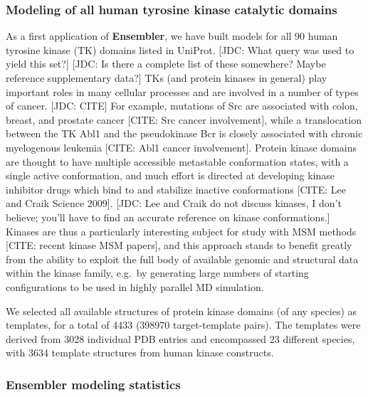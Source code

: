 \documentclass[aps,pre,twocolumn,nofootinbib,superscriptaddress,linenumbers]{revtex4-1}
\begin{document}
\subsubsection*{Modeling of all human tyrosine kinase catalytic domains}

As a first application of {\bf Ensembler}, we have built models for all 90 human tyrosine kinase (TK) domains listed in UniProt.
{\color{red}[JDC: What query was used to yield this set?]}
{\color{red}[JDC: Is there a complete list of these somewhere?  Maybe reference supplementary data?]}
TKs (and protein kinases in general) play important roles in many cellular processes and are involved in a number of types of cancer.
{\color{red}[JDC: CITE]}
For example, mutations of Src are associated with colon, breast, and prostate cancer {\color{red}[CITE: Src cancer involvement]}, while a translocation between the TK Abl1 and the pseudokinase Bcr is closely associated with chronic myelogenous leukemia {\color{red}[CITE: Abl1 cancer involvement]}.
Protein kinase domains are thought to have multiple accessible metastable conformation states, with a single active conformation, and much effort is directed at developing kinase inhibitor drugs which bind to and stabilize inactive conformations [CITE: Lee and Craik Science 2009].
{\color{red}[JDC: Lee and Craik do not discuss kinases, I don't believe; you'll have to find an accurate reference on kinase conformations.]}
Kinases are thus a particularly interesting subject for study with MSM methods [CITE: recent kinase MSM papers], and this approach stands to benefit greatly from the ability to exploit the full body of available genomic and structural data within the kinase family, e.g.~by generating large numbers of starting configurations to be used in highly parallel MD simulation.

We selected all available structures of protein kinase domains (of any species) as templates, for a total of 4433 (\num{398970} target-template pairs).
The templates were derived from 3028 individual PDB entries and encompassed 23 different species, with 3634 template structures from human kinase constructs.

\subsubsection*{Ensembler modeling statistics}
\end{document}
